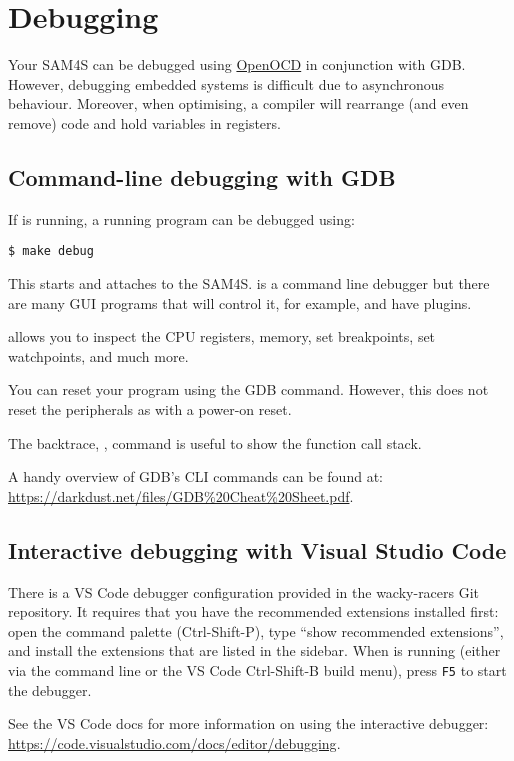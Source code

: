 \chapter{Debugging}
\label{debugging}

Your SAM4S can be debugged using \hyperref[OpenOCD]{OpenOCD} in
conjunction with GDB.  However, debugging embedded systems is
difficult due to asynchronous behaviour.  Moreover, when optimising, a
compiler will rearrange (and even remove) code and hold variables in
registers.

\section{Command-line debugging with GDB}

If  is running, a running program can be debugged using:

\begin{verbatim}
$ make debug
\end{verbatim}

This starts  and attaches to the SAM4S.  is
a command line debugger but there are many GUI programs that will
control it, for example,  and  have
plugins.

 allows you to inspect the CPU registers, memory, set
breakpoints, set watchpoints, and much more.

You can reset your program using the GDB  command.
However, this does not reset the peripherals as with a power-on reset.

The backtrace, , command is useful to show the function call
stack.

A handy overview of GDB's CLI commands can be found at:
\url{https://darkdust.net/files/GDB%20Cheat%20Sheet.pdf}.

\section{Interactive debugging with Visual Studio Code}

There is a VS Code debugger configuration provided in the wacky-racers
Git repository. It requires that you have the recommended extensions
installed first: open the command palette (Ctrl-Shift-P), type ``show
recommended extensions'', and install the extensions that are listed
in the sidebar. When  is running (either via the
command line or the VS Code Ctrl-Shift-B build menu), press \verb|F5|
to start the debugger.

See the VS Code docs for more information on using the interactive
debugger: \url{https://code.visualstudio.com/docs/editor/debugging}.
